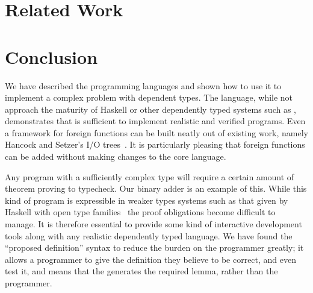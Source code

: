 \section{Related Work}

\section{Conclusion}

We have described the \Idris{} programming languages and shown how to
use it to implement a complex problem with dependent types. The
language, while not approach the maturity of Haskell or other
dependently typed systems such as \Agda{}, demonstrates that
 is sufficient to implement realistic and
verified programs. Even a framework for foreign functions can be built
neatly out of existing work, namely Hancock and Setzer's I/O
trees~\cite{hancock-interactive}. It is particularly pleasing that
foreign functions can be added without making  changes to
the core language.

Any program with a sufficiently complex type will require a certain
amount of theorem proving to typecheck. Our binary adder is an example
of this. While this kind of program is expressible in weaker types
systems such as that given by Haskell with open type
families~\cite{opentype-haskell} the proof obligations become
difficult to manage. It is therefore essential to provide some kind of
interactive development tools along with any realistic dependently
typed language. We have found the ``proposed definition'' syntax to
reduce the burden on the programmer greatly; it allows a programmer to
give the definition they believe to be correct, and even test it, and
means that the  generates the required lemma,
rather than the programmer.